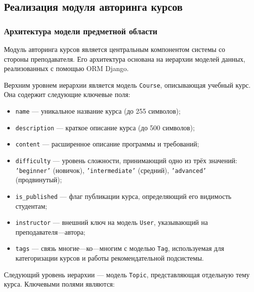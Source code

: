 \subsection{Реализация модуля авторинга курсов}
\label{subsec:authoring_module}

\subsubsection{Архитектура модели предметной области}

Модуль авторинга курсов является центральным компонентом системы со 
стороны преподавателя. Его архитектура основана на иерархии моделей 
данных, реализованных с помощью ORM Django.

Верхним уровнем иерархии является модель \texttt{Course}, описывающая 
учебный курс. Она содержит следующие ключевые поля:

\begin{itemize}
    \item \texttt{name} --- уникальное название курса (до 255 символов);
    \item \texttt{description} --- краткое описание курса (до 500 символов);
    \item \texttt{content} --- расширенное описание программы и требований;
    \item \texttt{difficulty} --- уровень сложности, принимающий одно из 
          трёх значений: \texttt{'beginner'} (новичок), 
          \texttt{'intermediate'} (средний), \texttt{'advanced'} (продвинутый);
    \item \texttt{is\_published} --- флаг публикации курса, определяющий 
          его видимость студентам;
    \item \texttt{instructor} --- внешний ключ на модель \texttt{User}, 
          указывающий на преподавателя---автора;
    \item \texttt{tags} --- связь многие---ко---многим с моделью \texttt{Tag}, 
          используемая для категоризации курсов и работы рекомендательной 
          подсистемы.
\end{itemize}

Следующий уровень иерархии --- модель \texttt{Topic}, представляющая 
отдельную тему курса. Ключевыми полями являются:

